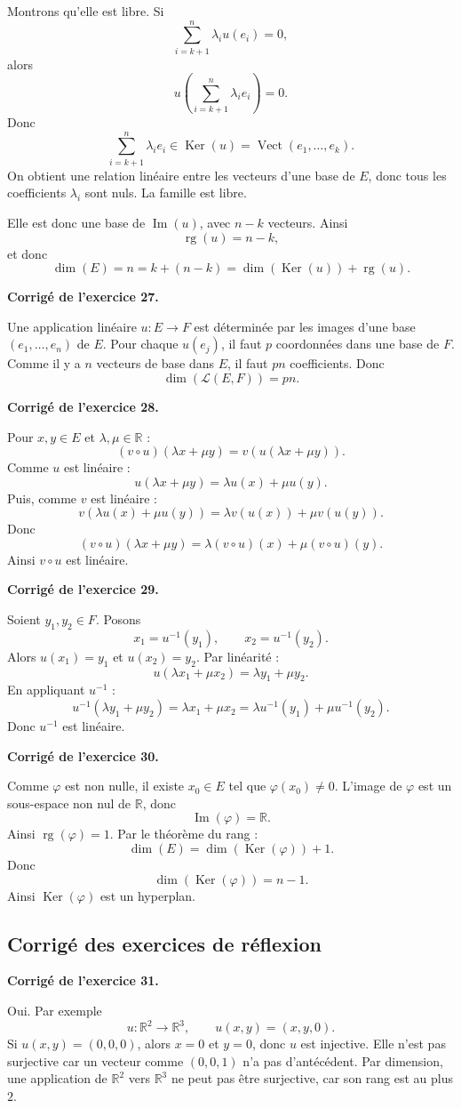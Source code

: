 \documentclass[11pt,a4paper]{article}
\newcommand{\corr}[1]{
    \vspace{0.35cm}
    \noindent\textbf{\textcolor{blue!60!black}{Corrigé de l'exercice #1.}}
    \par
}
\newcommand{\Ker}{\operatorname{Ker}}
\newcommand{\Img}{\operatorname{Im}}
\newcommand{\rg}{\operatorname{rg}}
\newcommand{\Vect}{\operatorname{Vect}}
\begin{document}
Montrons qu'elle est libre. Si
\[
\sum_{i=k+1}^n\lambda_i u(e_i)=0,
\]
alors
\[
u\left(\sum_{i=k+1}^n\lambda_i e_i\right)=0.
\]
Donc
\[
\sum_{i=k+1}^n\lambda_i e_i\in\Ker(u)=\Vect(e_1,\dots,e_k).
\]
On obtient une relation linéaire entre les vecteurs d'une base de $E$, donc tous les coefficients $\lambda_i$ sont nuls. La famille est libre.

Elle est donc une base de $\Img(u)$, avec $n-k$ vecteurs. Ainsi
\[
\rg(u)=n-k,
\]
et donc
\[
\dim(E)=n=k+(n-k)=\dim(\Ker(u))+\rg(u).
\]

\corr{27}
Une application linéaire $u:E\to F$ est déterminée par les images d'une base $(e_1,\dots,e_n)$ de $E$. Pour chaque $u(e_j)$, il faut $p$ coordonnées dans une base de $F$. Comme il y a $n$ vecteurs de base dans $E$, il faut $pn$ coefficients. Donc
\[
\dim(\mathcal{L}(E,F))=pn.
\]

\corr{28}
Pour $x,y\in E$ et $\lambda,\mu\in\mathbb{R}$ :
\[
(v\circ u)(\lambda x+\mu y)
=v(u(\lambda x+\mu y)).
\]
Comme $u$ est linéaire :
\[
u(\lambda x+\mu y)=\lambda u(x)+\mu u(y).
\]
Puis, comme $v$ est linéaire :
\[
v(\lambda u(x)+\mu u(y))=\lambda v(u(x))+\mu v(u(y)).
\]
Donc
\[
(v\circ u)(\lambda x+\mu y)=\lambda(v\circ u)(x)+\mu(v\circ u)(y).
\]
Ainsi $v\circ u$ est linéaire.

\corr{29}
Soient $y_1,y_2\in F$. Posons
\[
x_1=u^{-1}(y_1),\qquad x_2=u^{-1}(y_2).
\]
Alors $u(x_1)=y_1$ et $u(x_2)=y_2$. Par linéarité :
\[
u(\lambda x_1+\mu x_2)=\lambda y_1+\mu y_2.
\]
En appliquant $u^{-1}$ :
\[
u^{-1}(\lambda y_1+\mu y_2)=\lambda x_1+\mu x_2
=\lambda u^{-1}(y_1)+\mu u^{-1}(y_2).
\]
Donc $u^{-1}$ est linéaire.

\corr{30}
Comme $\varphi$ est non nulle, il existe $x_0\in E$ tel que $\varphi(x_0)\neq 0$. L'image de $\varphi$ est un sous-espace non nul de $\mathbb{R}$, donc
\[
\Img(\varphi)=\mathbb{R}.
\]
Ainsi $\rg(\varphi)=1$. Par le théorème du rang :
\[
\dim(E)=\dim(\Ker(\varphi))+1.
\]
Donc
\[
\dim(\Ker(\varphi))=n-1.
\]
Ainsi $\Ker(\varphi)$ est un hyperplan.

\subsection{Corrigé des exercices de réflexion}

\corr{31}
Oui. Par exemple
\[
u:\mathbb{R}^2\to\mathbb{R}^3,\qquad u(x,y)=(x,y,0).
\]
Si $u(x,y)=(0,0,0)$, alors $x=0$ et $y=0$, donc $u$ est injective. Elle n'est pas surjective car un vecteur comme $(0,0,1)$ n'a pas d'antécédent. Par dimension, une application de $\mathbb{R}^2$ vers $\mathbb{R}^3$ ne peut pas être surjective, car son rang est au plus $2$.
\end{document}
